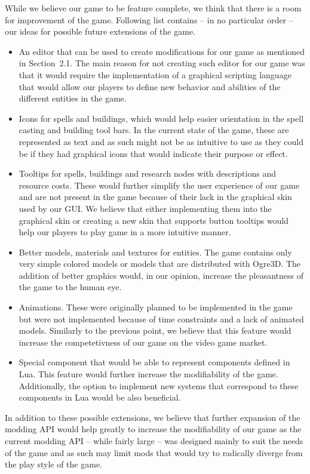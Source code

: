 While we believe our game to be feature complete, we think that there is a room for improvement of the game.
Following list contains -- in no particular order -- our ideas for possible future extensions of the game.

\begin{itemize}
    \item An editor that can be used to create modifications for our game as mentioned in Section~2.1. The main reason for not creating
        such editor for our game was that it would require the implementation of a graphical scripting language that would allow our
        players to define new behavior and abilities of the different entities in the game.
    \item Icons for spells and buildings, which would help easier orientation in the spell casting and building tool bars. In the current
        state of the game, these are represented as text and as such might not be as intuitive to use as they could be if they had
        graphical icons that would indicate their purpose or effect.
    \item Tooltips for spells, buildings and research nodes with descriptions and resource costs. These would further simplify the user
        experience of our game and are not present in the game because of their lack in the graphical skin used by our GUI. We believe
        that either implementing them into the graphical skin or creating a new skin that supports button tooltips would help our players
        to play game in a more intuitive manner.
    \item Better models, materials and textures for entities. The game contains only very simple colored models or models that are distributed
        with Ogre3D. The addition of better graphics would, in our opinion, increase the pleasantness of the game to the human eye.
    \item Animations. These were originally planned to be implemented in the game but were not implemented because of time constraints
        and a lack of animated models. Similarly to the previous point, we believe that this feature would increase the competetivness
        of our game on the video game market.
    \item Special component that would be able to represent components defined in Lua. This feature would further increase the modifiability
        of the game. Additionally, the option to implement new systems that correspond to these components in Lua would be also beneficial.
\end{itemize}

In addition to these possible extensions, we believe that further expansion of the modding API would help greatly to increase the
modifiability of our game as the current modding API -- while fairly large -- was designed mainly to suit the needs of the game and as such
may limit mods that would try to radically diverge from the play style of the game.
